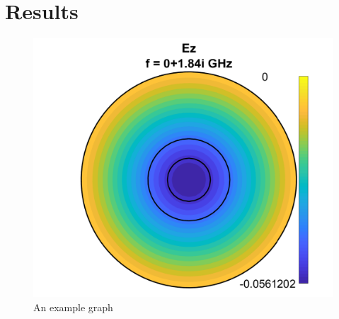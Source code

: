 \documentclass[12pt,oneside]{article}
\begin{document}
\section{Results}
	\begin{figure}[h]
	\centering
	\includegraphics[scale=0.5]{magnitude6}
	\caption{An example graph}
	\label{fig:x cubed graph}
	\end{figure}
\end{document}
